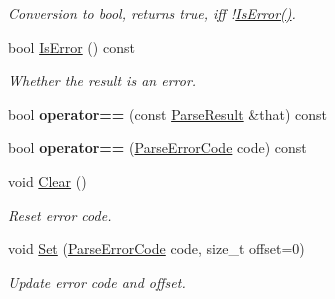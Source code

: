 \begin{DoxyCompactItemize}
\begin{DoxyCompactList}\small\item\em Conversion to {\ttfamily bool}, returns {\ttfamily true}, iff !\hyperlink{struct_parse_result_a07c35a6769f5cb8a73cbc56c41e60a2a}{Is\+Error()}. \end{DoxyCompactList}\item 
bool \hyperlink{struct_parse_result_a07c35a6769f5cb8a73cbc56c41e60a2a}{Is\+Error} () const \hypertarget{struct_parse_result_a07c35a6769f5cb8a73cbc56c41e60a2a}{}\label{struct_parse_result_a07c35a6769f5cb8a73cbc56c41e60a2a}

\begin{DoxyCompactList}\small\item\em Whether the result is an error. \end{DoxyCompactList}\item 
bool {\bfseries operator==} (const \hyperlink{struct_parse_result}{Parse\+Result} \&that) const \hypertarget{struct_parse_result_a90794619408c295ffa923f3307526bed}{}\label{struct_parse_result_a90794619408c295ffa923f3307526bed}

\item 
bool {\bfseries operator==} (\hyperlink{group___r_a_p_i_d_j_s_o_n___e_r_r_o_r_s_ga8d4b32dfc45840bca189ade2bbcb6ba7}{Parse\+Error\+Code} code) const \hypertarget{struct_parse_result_a5a0bd70f5bbb383ac63a6450ac4ae4d1}{}\label{struct_parse_result_a5a0bd70f5bbb383ac63a6450ac4ae4d1}

\item 
void \hyperlink{struct_parse_result_a88b6d44f052a19e6436ae6aadc2c40b4}{Clear} ()\hypertarget{struct_parse_result_a88b6d44f052a19e6436ae6aadc2c40b4}{}\label{struct_parse_result_a88b6d44f052a19e6436ae6aadc2c40b4}

\begin{DoxyCompactList}\small\item\em Reset error code. \end{DoxyCompactList}\item 
void \hyperlink{struct_parse_result_aa81b4a7b776b77216cb752385203a8c1}{Set} (\hyperlink{group___r_a_p_i_d_j_s_o_n___e_r_r_o_r_s_ga8d4b32dfc45840bca189ade2bbcb6ba7}{Parse\+Error\+Code} code, size\+\_\+t offset=0)\hypertarget{struct_parse_result_aa81b4a7b776b77216cb752385203a8c1}{}\label{struct_parse_result_aa81b4a7b776b77216cb752385203a8c1}

\begin{DoxyCompactList}\small\item\em Update error code and offset. \end{DoxyCompactList}\end{DoxyCompactItemize}
